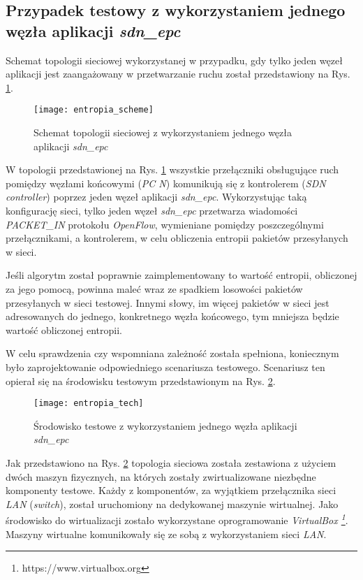\subsection{Przypadek testowy z wykorzystaniem jednego węzła aplikacji
  \textit{sdn\_epc}} \label{entropy_one_node}

Schemat topologii sieciowej wykorzystanej w przypadku, gdy tylko jeden węzeł
aplikacji jest zaangażowany w przetwarzanie ruchu został przedstawiony na
Rys. \ref{fig:entropia_scheme}.

\begin{figure}[h]
\centering
\texttt{[image: entropia\_scheme]}
\caption{Schemat topologii sieciowej z wykorzystaniem jednego węzła aplikacji
  \textit{sdn\_epc}}
\label{fig:entropia_scheme}
\end{figure}

W topologii przedstawionej na Rys. \ref{fig:entropia_scheme} wszystkie
przełączniki obsługujące ruch pomiędzy węzłami końcowymi (\textit{PC N})
komunikują się z kontrolerem (\textit{SDN controller}) poprzez jeden węzeł
aplikacji \textit{sdn\_epc}. Wykorzystując taką konfigurację sieci, tylko jeden
węzeł \textit{sdn\_epc} przetwarza wiadomości \mbox{\textit{PACKET\_IN}}
protokołu \textit{OpenFlow}, wymieniane pomiędzy poszczególnymi przełącznikami,
a kontrolerem, w celu obliczenia entropii pakietów przesyłanych w sieci.

Jeśli algorytm został poprawnie zaimplementowany to wartość entropii,
obliczonej za jego pomocą, powinna maleć wraz ze spadkiem losowości pakietów
przesyłanych w sieci testowej. Innymi słowy, im więcej pakietów w sieci jest
adresowanych do jednego, konkretnego węzła końcowego, tym mniejsza będzie wartość
obliczonej entropii.

W celu sprawdzenia czy wspomniana zależność została spełniona, koniecznym było
zaprojektowanie odpowiedniego scenariusza testowego. Scenariusz ten opierał się
na środowisku testowym przedstawionym na Rys. \ref{fig:entropia_tech}.

\begin{figure}[h]
\centering
\texttt{[image: entropia\_tech]}
\caption{Środowisko testowe z wykorzystaniem jednego węzła aplikacji
  \textit{sdn\_epc}}
\label{fig:entropia_tech}
\end{figure}

Jak przedstawiono na Rys. \ref{fig:entropia_tech} topologia sieciowa została
zestawiona z użyciem dwóch maszyn fizycznych, na których zostały zwirtualizowane
niezbędne komponenty testowe. Każdy z komponentów, za wyjątkiem przełącznika
sieci \textit{LAN} (\textit{switch}), został uruchomiony na dedykowanej maszynie
wirtualnej. Jako środowisko do wirtualizacji zostało wykorzystane oprogramowanie
\textit{VirtualBox \footnote{https://www.virtualbox.org}}. Maszyny wirtualne
komunikowały się ze sobą z wykorzystaniem sieci \textit{LAN}.


